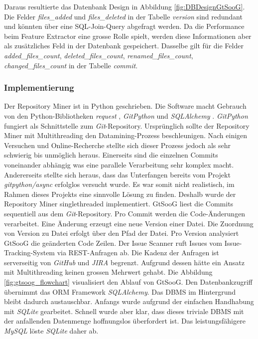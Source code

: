 \documentclass[10pt, a4paper]{article}
\begin{document}
Daraus resultierte das Datenbank Design in Abbildung \ref{fig:DBDesignGtSooG}. Die Felder \emph{files\_added} und \emph{files\_deleted} in der Tabelle \emph{version} sind redundant und könnten über eine SQL-Join-Query abgefragt werden. Da die Performance beim Feature Extractor eine grosse Rolle spielt, werden diese Informationen aber als zusätzliches Feld in der Datenbank gespeichert. Dasselbe gilt für die Felder\emph{ added\_files\_count}, \emph{deleted\_files\_count}, \emph{renamed\_files\_count}, \emph{changed\_files\_count} in der Tabelle \emph{commit}.

\subsubsection{Implementierung} \label{par:gtsoogtechnicalimplementation}
Der Repository Miner ist in Python geschrieben. Die Software macht Gebrauch von den Python-Bibliotheken \emph{request} \cite{pythonrequests}, \emph{GitPython} \cite{gitpython} und \emph{SQLAlchemy} \cite{sqlalchemy}.
\emph{GitPython} fungiert als Schnittstelle zum \emph{Git}-Repository. Ursprünglich sollte der Repository Miner mit Multithreading den Datamining-Prozess beschleunigen. Nach einigen Versuchen und Online-Recherche stellte sich dieser Prozess jedoch als sehr schwierig bis unmöglich heraus. Einerseits sind die einzelnen Commits voneinander abhängig was eine parallele Verarbeitung sehr komplex macht. Andererseits stellte sich heraus, dass das Unterfangen bereits vom Projekt \emph{gitpython/async} \cite{gitpythonasync} erfolglos versucht wurde. Es war somit nicht realistisch, im Rahmen dieses Projekts eine sinnvolle Lösung zu finden. Deshalb wurde der Repository Miner singlethreaded implementiert.
GtSooG liest die Commits sequentiell aus dem \emph{Git}-Repository. Pro Commit werden die Code-Änderungen verarbeitet. Eine Änderung erzeugt eine neue Version einer Datei. Die Zuordnung von Version zu Datei erfolgt über den Pfad der Datei. Pro Version analysiert GtSooG die geänderten Code Zeilen.
Der Issue Scanner ruft Issues vom Issue-Tracking-System via REST-Anfragen ab. Die Kadenz der Anfragen ist serverseitig von \emph{GitHub} und \emph{JIRA} begrenzt. Aufgrund dessen hätte ein Ansatz mit Multithreading keinen grossen Mehrwert gehabt. Die Abbildung \ref{fig:gtsoog_flowchart} visualisiert den Ablauf von GtSooG.
Den Datenbankzugriff übernimmt das \ac{ORM} Framework \emph{SQLAlchemy}. Das \ac{DBMS} im Hintergrund bleibt dadurch austauschbar. Anfangs wurde aufgrund der einfachen Handhabung mit \emph{SQLite} gearbeitet. Schnell wurde aber klar, dass dieses triviale \ac{DBMS} mit der anfallenden Datenmenge hoffnungslos überfordert ist. Das leistungsfähigere \emph{MySQL} löste \emph{SQLite} daher ab.
\end{document}
